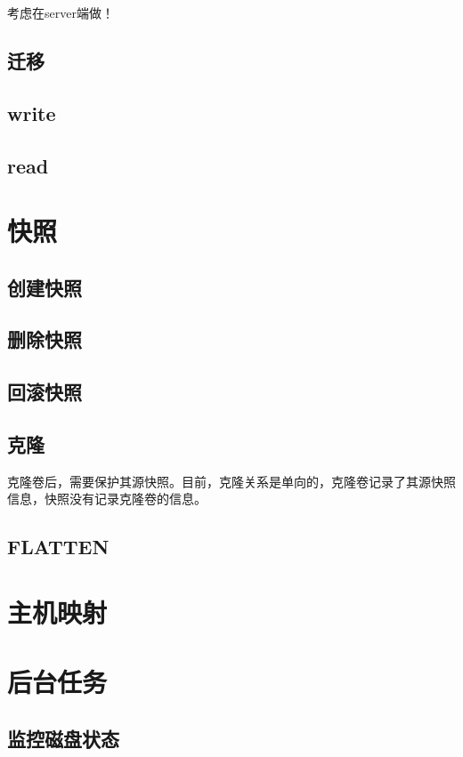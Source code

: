 考虑在server端做！

\subsection{迁移}

\subsection{write}
\subsection{read}

\section{快照}

\subsection{创建快照}

\subsection{删除快照}

\subsection{回滚快照}

\subsection{克隆}

克隆卷后，需要保护其源快照。目前，克隆关系是单向的，克隆卷记录了其源快照信息，快照没有记录克隆卷的信息。

\subsection{FLATTEN}

\section{主机映射}

\section{后台任务}

\subsection{监控磁盘状态}

